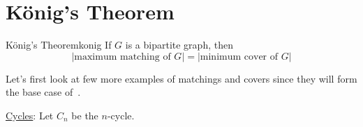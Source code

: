\section{König's Theorem}

\begin{Theorem}{König's Theorem}{konig}
    If $ G $ is a bipartite graph, then
    \[ |\text{maximum matching of }G|=|\text{minimum cover of }G| \]
\end{Theorem}

Let's first look at few more examples of matchings and covers since they will form the
base case of~.

\underline{Cycles}: Let $ C_n $ be the $ n $-cycle.


\begin{figure}[H]
    \centering
    \begin{tikzpicture}[x=0.75pt,y=0.75pt,yscale=-1,xscale=1]


\end{tikzpicture}
\end{figure}
